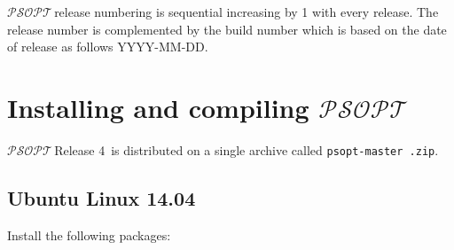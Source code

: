 \documentclass[a4paper,11pt]{report}    %
\newcommand{\psopt}{$\mathcal{PSOPT}$\,}  %
\newcommand{\release}{Release 4 \,}
\newcommand{\basedir}{\texttt{psopt-master\,}}
\begin{document}
\psopt release numbering is sequential increasing by 1 with every release. The release number is complemented by the build number which is based on the date of release as follows  YYYY-MM-DD.
 

\section{Installing and compiling \psopt}


\psopt \release is distributed on a single archive called \texttt{\basedir.zip}. 

\subsection{Ubuntu Linux 14.04}

Install the following packages:
\end{document}
